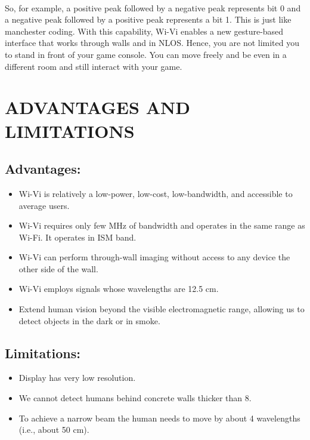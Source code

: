 \documentclass[a4paper,12pt,oneside]{article}
\begin{document}
\paragraph{}
So, for example, a positive peak followed by a negative peak represents bit 0 and a
negative peak followed by a positive peak represents a bit 1. This is just like manchester coding.
With this capability, Wi-Vi enables a new gesture-based interface that works through walls and in
NLOS. Hence, you are not limited you to stand in front of your game console. You can move
freely and be even in a different room and still interact with your game.

\newpage
\section{ADVANTAGES AND LIMITATIONS}
\subsection{Advantages:}

\begin{itemize}
    \item Wi-Vi is relatively a low-power, low-cost, low-bandwidth, and accessible to average
users.
	\item Wi-Vi requires only few MHz of bandwidth and operates in the same range as Wi-Fi. It
operates in ISM band.
	\item Wi-Vi can perform through-wall imaging without access to any device the other side of
the wall.
	\item Wi-Vi employs signals whose wavelengths are 12.5 cm.
	\item Extend human vision beyond the visible electromagnetic range, allowing us to detect
objects in the dark or in smoke.
\end{itemize}

\subsection{Limitations:}

\begin{itemize}
    	\item Display has very low resolution.
	\item We cannot detect humans behind concrete walls thicker than 8.
	\item To achieve a narrow beam the human needs to move by about 4 wavelengths (i.e., about
50 cm).
\end{itemize}
\end{document}
